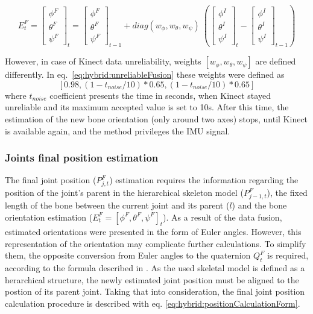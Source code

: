 \documentclass[sensors,article,submit,moreauthors,pdftex,10pt,a4paper]{mdpi}
\begin{document}
		
	\begin{equation} 
		\label{eq:hybrid:unreliableFusion}
		E^F_t = 
		\begin{bmatrix}  \phi^F \\  \theta^F \\  \psi^F \end{bmatrix}_t = 
		\begin{bmatrix}  \phi^F \\  \theta^F \\  \psi^F \end{bmatrix}_{t-1} +
		diag(w_\phi,w_\theta,w_\psi)\
		(\begin{bmatrix}  \phi^I \\  \theta^I \\  \psi^I \end{bmatrix}_t -
		\begin{bmatrix}  \phi^I \\  \theta^I \\  \psi^I \end{bmatrix}_{t-1})
	\end{equation}
		
	However, in case of Kinect data unreliability, weights $[w_\phi , w_\theta , w_\psi]$ are defined differently. In eq.~\ref{eq:hybrid:unreliableFusion} these weights were defined as $$[0.98,(1-t_{noise}/10)*0.65,(1-t_{noise}/10)*0.65]$$ where $t_{noise}$ coefficient presents the time in seconds, when Kinect stayed unreliable and its maximum accepted value is set to 10s. After this time, the estimation of the new bone orientation (only around two axes) stops, until Kinect is available again, and the method privileges the IMU signal.
		
	\subsubsection{Joints final position estimation}
	The final joint position ($P_{j,t}^F$) estimation requires the information regarding the position of the joint’s parent in the hierarchical skeleton model ($P_{j-1,t}^F$), the fixed length of the bone between the current joint and its parent ($l$) and the bone orientation estimation ($E_t^F=[\phi^F,\theta^F,\psi^F]_t$). As a result of the data fusion, estimated orientations were presented in the form of Euler angles. However, this representation of the orientation may complicate further calculations. To simplify them, the opposite conversion from Euler angles to the quaternion $Q_t^F$ is required, according to the formula described in \cite{Dunn2011}. As the used skeletal model is defined as a herarchical structure, the newly estimated joint position must be aligned to the postion of its parent joint. Taking that into consideration, the final joint position calculation procedure is described with eq. \ref{eq:hybrid:positionCalculationForm}.
		
\end{document}

